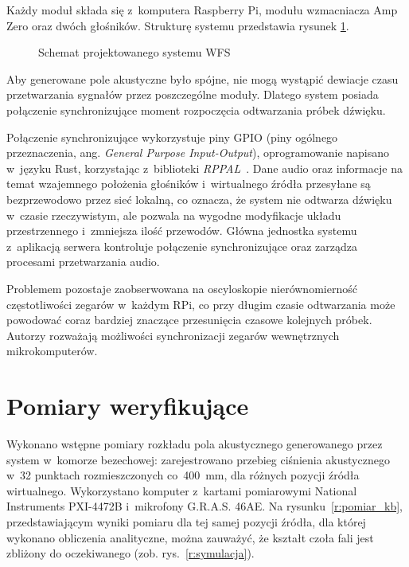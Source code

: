 \documentclass[10pt, a4paper]{article}
\let\Oldsection\section
\renewcommand{\section}{\FloatBarrier\Oldsection}
\begin{document}
Każdy moduł składa się z~komputera Raspberry Pi, modułu wzmacniacza Amp Zero
oraz dwóch głośników. 
Strukturę systemu przedstawia rysunek \ref{fig:schemat}.

\begin{figure}[!tbh]
  \centering
  \caption{Schemat projektowanego systemu WFS}
  \label{fig:schemat}
\end{figure}

Aby generowane pole akustyczne było spójne, nie mogą wystąpić dewiacje czasu
przetwarzania sygnałów przez poszczególne moduły. Dlatego system posiada połączenie
synchronizujące moment rozpoczęcia odtwarzania próbek dźwięku.

Połączenie synchronizujące wykorzystuje piny GPIO (piny ogólnego przeznaczenia, ang.
\textit{General Purpose Input-Output}), oprogramowanie napisano w~języku 
Rust, korzystając z~biblioteki 
\emph{RPPAL}~\cite{RPPAL}. Dane audio oraz informacje na temat wzajemnego położenia 
głośników i~wirtualnego źródła przesyłane są bezprzewodowo przez sieć lokalną, co
oznacza, że system nie odtwarza dźwięku w~czasie rzeczywistym, ale
pozwala na wygodne modyfikacje układu przestrzennego i~zmniejsza ilość
przewodów. Główna jednostka systemu z~aplikacją serwera kontroluje połączenie
synchronizujące oraz zarządza procesami przetwarzania audio.

Problemem pozostaje zaobserwowana na oscyloskopie nierównomierność częstotli\-wości zegarów w~każdym RPi,
co przy długim czasie odtwarzania może powodować coraz bardziej znaczące przesunięcia czasowe kolejnych próbek.
Autorzy rozważają możliwości synchronizacji zegarów wewnętrznych mikrokomputerów.

\section{Pomiary weryfikujące}

Wykonano wstępne pomiary rozkładu pola akustycznego generowanego przez system 
w~komorze bezechowej: zarejestrowano przebieg ciśnienia akustycznego w~32 punktach 
rozmieszczonych co~\SI{400}{\milli\metre}, dla różnych pozycji źródła wirtualnego.
Wykorzystano komputer z~kartami pomiarowymi National Instruments PXI-4472B i~mikrofony
G.R.A.S. 46AE.
Na rysunku~\ref{r:pomiar_kb}, przedstawiającym wyniki pomiaru dla tej samej pozycji 
źródła, dla której wykonano obliczenia analityczne, można zauważyć,
że kształt czoła fali jest zbliżony do oczekiwanego (zob. rys.~\ref{r:symulacja}).
\end{document}
